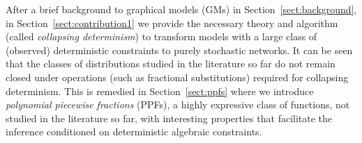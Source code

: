 After a brief background to %
graphical models (GMs) in Section~\ref{sect:background}, 
in Section~\ref{sect:contribution1} we provide the necessary theory and algorithm (called \emph{collapsing determinism}) 
to transform models with a large class of (observed) deterministic constraints to purely stochastic networks. %
It can be seen that the classes of distributions studied in the literature so far do not remain closed under operations (such as fractional substitutions) required for collapsing determinism.
This is remedied in 
Section~\ref{sect:ppfs} where we 
introduce \emph{polynomial piecewise fractions} (PPFs), a highly expressive class of functions, not studied in the literature so far, 
with interesting properties that facilitate the inference conditioned on deterministic algebraic constraints.



